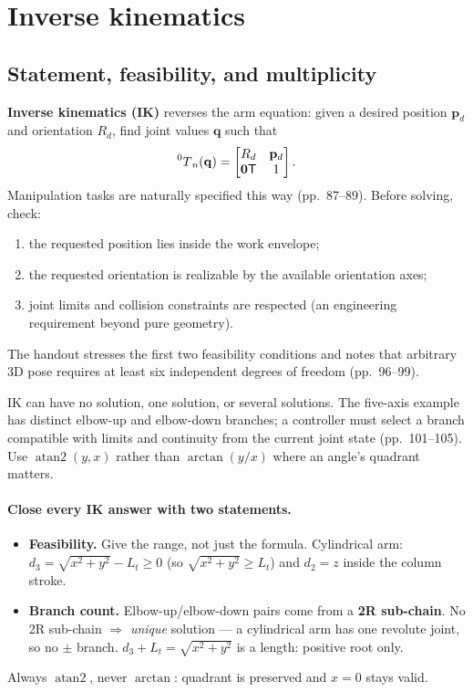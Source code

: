 \documentclass[11pt,a4paper]{article}
\newcommand{\trans}{\mathsf{T}}
\newcommand{\atanTwo}{\operatorname{atan2}}
\begin{document}
\section{Inverse kinematics}

\subsection{Statement, feasibility, and multiplicity}

\textbf{Inverse kinematics (IK)} reverses the arm equation: given a desired position $\mathbf p_d$ and orientation $R_d$, find joint values $\mathbf q$ such that
\[
  \prescript{0}{}{T}_{n}(\mathbf q)=
  \begin{bmatrix}R_d&\mathbf p_d\\\mathbf0\trans&1\end{bmatrix}.
\]
Manipulation tasks are naturally specified this way (pp.~87--89). Before solving, check:
\begin{enumerate}
  \item the requested position lies inside the work envelope;
  \item the requested orientation is realizable by the available orientation axes;
  \item joint limits and collision constraints are respected (an engineering requirement beyond pure geometry).
\end{enumerate}
The handout stresses the first two feasibility conditions and notes that arbitrary 3D pose requires at least six independent degrees of freedom (pp.~96--99).

IK can have no solution, one solution, or several solutions. The five-axis example has distinct elbow-up and elbow-down branches; a controller must select a branch compatible with limits and continuity from the current joint state (pp.~101--105). Use $\atanTwo(y,x)$ rather than $\arctan(y/x)$ where an angle's quadrant matters.

\paragraph{Close every IK answer with two statements.}
\begin{itemize}
\item \textbf{Feasibility.} Give the range, not just the formula. Cylindrical arm:
      $d_3=\sqrt{x^2+y^2}-L_t\ge 0$ (so $\sqrt{x^2+y^2}\ge L_t$) and $d_2=z$ inside the column
      stroke.
\item \textbf{Branch count.} Elbow-up/elbow-down pairs come from a \textbf{2R sub-chain}. No 2R
      sub-chain $\Rightarrow$ \emph{unique} solution --- a cylindrical arm has one revolute joint,
      so no $\pm$ branch. $d_3+L_t=\sqrt{x^2+y^2}$ is a length: positive root only.
\end{itemize}
Always $\operatorname{atan2}$, never $\arctan$: quadrant is preserved and $x=0$ stays valid.
\end{document}
